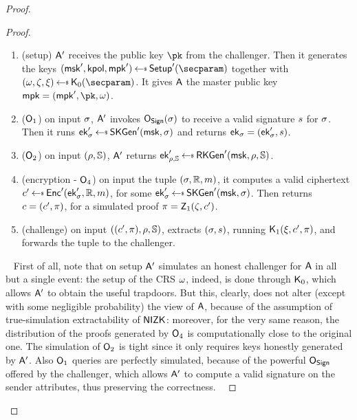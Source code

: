\begin{proof}
\begin{lemma}
\begin{proof}
            \begin{enumerate}
                \item (setup) $\mathsf{A}'$ receives the public key $\pk$ from the challenger. Then it generates the keys $(\msk', \kpol, \mpk') \getsr \setup'(\secparam)$ together with $(\crs,\tpsim,\tpext)\getsr\nizkext_0(\secparam)$. It gives $\mathsf{A}$ the master public key $\mpk = (\mpk', \pk, \crs)$.
                \item ($\mathsf{O}_1$) on input $\sigma$, $\mathsf{A}'$ invokes $\mathsf{O}_{\mathsf{Sign}}(\sigma)$ to receive a valid signature $s$ for $\sigma$. Then it runs $\ek'_\sattr \getsr \skgen'(\msk, \sattr)$ and returns $\mathsf{ek}_\sigma = (\mathsf{ek}_\sigma', s)$.
                \item ($\mathsf{O}_2$) on input $(\rho, \mathbb{S})$, $\mathsf{A}'$ returns $\ek'_{\rattr, \saccess} \getsr \rkgen'(\msk, \rattr, \saccess)$.
                \item (encryption - $\mathsf{O}_4$) on input the tuple $(\sigma, \mathbb{R}, m)$, it computes a valid ciphertext $\cipher' \getsr \enc'(\ek'_\sattr, \raccess, \msg)$, for some $\ek'_\sattr \getsr \skgen'(\msk, \sattr)$. Then returns $c = (c', \pi)$, for a simulated proof $\pi = \mathsf{Z}_1(\zeta, c')$.
                \item (challenge) on input $((c', \pi), \rho, \mathbb{S})$, extracts $(\sigma, s)$, running $\mathsf{K}_1(\xi, c', \pi)$, and forwards the tuple to the challenger.
            \end{enumerate}
            ~\newline
            First of all, note that on setup $\mathsf{A}'$ simulates an honest challenger for $\mathsf{A}$ in all but a single event: the setup of the CRS $\omega$, indeed, is done through $\mathsf{K}_0$, which allows $\mathsf{A}'$ to obtain the useful trapdoors. But this, clearly, does not alter (except with some negligible probability) the view of $\mathsf{A}$, because of the assumption of true-simulation extractability of $\mathsf{NIZK}$: moreover, for the very same reason, the distribution of the proofs generated by $\mathsf{O}_4$ is computationally close to the original one.
            The simulation of $\mathsf{O}_2$ is tight since it only requires keys honestly generated by $\mathsf{A}'$.
            Also $\mathsf{O}_1$ queries are perfectly simulated, because of the powerful $\mathsf{O}_{\mathsf{Sign}}$ offered by the challenger, which allows $\mathsf{A}'$ to compute a valid signature on the sender attributes, thus preserving the correctness.
            ~\newline\newline

\end{proof}
\end{lemma}
\end{proof}
